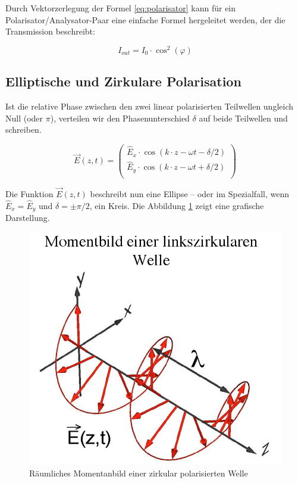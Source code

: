 Durch   Vektorzerlegung  der  Formel   \ref{eq:polarisator}   kann   f\"ur   ein
Polarisator/Analysator-Paar  eine  einfache  Formel  hergeleitet werden, der die
Transmission beschreibt:

\begin{equation}
    I_{out} = I_0 \cdot \cos^2(\varphi)
    \label{eq:pol_paar}
\end{equation}


\subsection{Elliptische und Zirkulare Polarisation}

Ist  die  relative  Phase  zwischen  den zwei  linear  polarisierten  Teilwellen
ungleich  Null  (oder  $\pi$),  verteilen wir den Phasenunterschied $\delta$ auf
beide Teilwellen und schreiben.

\begin{equation}
    \vec{E}(z,t) = \begin{pmatrix}
        \hat{E}_x\cdot\cos(k \cdot z - \omega t - \delta/2) \\
        \hat{E}_y\cdot\cos(k \cdot z - \omega t + \delta/2) \\
    \end{pmatrix}
    \label{eq:ellip}
\end{equation}

Die Funktion $\vec{E}(z,t)$  beschreibt nun eine Ellipse -- oder im Spezialfall,
wenn  $\hat{E}_x=\hat{E}_y$  und $\delta=\pm\pi/2$,  ein  Kreis.  Die  Abbildung
\ref{fig:zirkular_pol} zeigt eine grafische Darstellung.

\begin{figure}[H]
    \centering
    \includegraphics[width=.5\linewidth]{images/polarisation-zirkular.png}
    \caption{R\"aumliches Momentanbild einer zirkular polarisierten Welle}
    \label{fig:zirkular_pol}
\end{figure}

